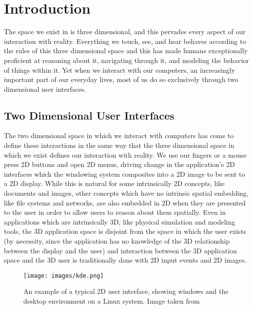 \chapter{Introduction}
The space we exist in is three dimensional, and this pervades every aspect of our interaction with reality. Everything we touch, see, and hear behaves according to the rules of this three dimensional space and this has made humans exceptionally proficient at reasoning about it, navigating through it, and modeling the behavior of things within it. Yet when we interact with our computers, an increasingly important part of our everyday lives, most of us do so exclusively through two dimensional user interfaces.  
 
\section{Two Dimensional User Interfaces}

The two dimensional space in which we interact with computers has come to define these interactions in the same way that the three dimensional space in which we exist defines our interaction with reality. We use our fingers or a mouse press 2D buttons and open 2D menus, driving change in the application's 2D interfaces which the windowing system composites into a 2D image to be sent to a 2D display. While this is natural for some intrinsically 2D concepts, like documents and images, other concepts which have no intrinsic spatial embedding, like file systems and networks, are also embedded in 2D when they are presented to the user in order to allow users to reason about them spatially. Even in applications which are intrinsically 3D, like physical simulation and modeling tools, the 3D application space is disjoint from the space in which the user exists (by necessity, since the application has no knowledge of the 3D relationship between the display and the user) and interaction between the 3D application space and the 3D user is traditionally done with 2D input events and 2D images.  

\begin{figure}[ht!]
\centering
\texttt{[image: images/kde.png]}
\caption{An example of a typical 2D user interface, showing windows and the desktop environment on a Linux system. Image taken from  \protect\cite{kde-image}}
\label{fig:kde}
\end{figure}
	
